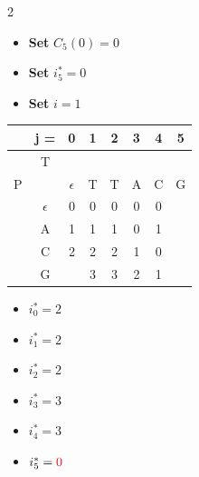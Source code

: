 \begin{multicols}{2}

    \begin{itemize}
        \item \textbf{Set} $C_5(0) = 0$
        \item \textbf{Set} $i_5^\ast = 0$
        \item \textbf{Set} $i = 1$
    \end{itemize}
    \begin{center}
        \begin{tabular}{|c c|c|c|c|c|c|c|} \hline
        &   j =     &  0            &   1   &   2   &   3   &   4   &   5   \\ \hline
        &   T       &               &       &       &       &       &       \\
        P   &       &  $\epsilon$   &   T   &   T   &   A   &   C   &   G   \\ \hline
        & $\epsilon$&       0       &0      &  0    & 0     &  0    &   \ccr0    \\ \hline
        &    A      &       1       &   1   &  1    & 0     & 1     &       \\ \hline
        &    C      &   2           &   2   &   2   &  1    & 0     &       \\ \hline
        &    G      &               &3      &  3    & 2     &  1    &       \\ \hline
        \end{tabular}
    \end{center}
    \columnbreak
    \begin{itemize}
        \item $i_0^\ast = 2$
        \item $i_1^\ast = 2 $
        \item $i_2^\ast = 2$
        \item $i_3^\ast = 3$
        \item $i_4^\ast = 3 $
        \item $i_5^\ast = \textcolor{red}{0} $
    \end{itemize}
\end{multicols}


